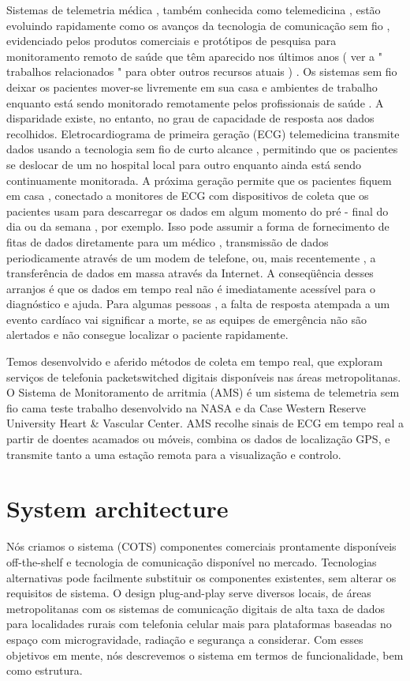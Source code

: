 \documentclass[a4paper,12pt]{article}
\begin{document}
Sistemas de telemetria médica , também conhecida como telemedicina , estão evoluindo rapidamente como os avanços da tecnologia de comunicação sem fio , evidenciado pelos produtos comerciais e protótipos de pesquisa para monitoramento remoto de saúde que têm aparecido nos últimos anos ( ver a " trabalhos relacionados " para obter outros recursos atuais ) . Os sistemas sem fio deixar os pacientes mover-se livremente em sua casa e ambientes de trabalho enquanto está sendo monitorado remotamente pelos profissionais de saúde . A disparidade existe, no entanto, no grau de capacidade de resposta aos dados recolhidos. Eletrocardiograma de primeira geração (ECG) telemedicina transmite dados usando a tecnologia sem fio de curto alcance , permitindo que os pacientes se deslocar de um no hospital local para outro enquanto ainda está sendo continuamente monitorada. A próxima geração permite que os pacientes fiquem em casa , conectado a monitores de ECG com dispositivos de coleta que os pacientes usam para descarregar os dados em algum momento do pré - final do dia ou da semana , por exemplo. Isso pode assumir a forma de fornecimento de fitas de dados diretamente para um médico , transmissão de dados periodicamente através de um modem de telefone, ou, mais recentemente , a transferência de dados em massa através da Internet. A conseqüência desses arranjos é que os dados em tempo real não é imediatamente acessível para o diagnóstico e ajuda. Para algumas pessoas , a falta de resposta atempada a um evento cardíaco vai significar a morte, se as equipes de emergência não são alertados e não consegue localizar o paciente rapidamente.

Temos desenvolvido e aferido métodos de coleta em tempo real, que exploram serviços de telefonia packetswitched digitais disponíveis nas áreas metropolitanas. O Sistema de Monitoramento de arritmia (AMS) é um sistema de telemetria sem fio cama teste trabalho desenvolvido na NASA e da Case Western Reserve University Heart & Vascular Center. AMS recolhe sinais de ECG em tempo real a partir de doentes acamados ou móveis, combina os dados de localização GPS, e transmite tanto a uma estação remota para a visualização e controlo.

\section{System architecture}

Nós criamos o sistema (COTS) componentes comerciais prontamente disponíveis off-the-shelf e tecnologia de comunicação disponível no mercado. Tecnologias alternativas pode facilmente substituir os componentes existentes, sem alterar os requisitos de sistema. O design plug-and-play serve diversos locais, de áreas metropolitanas com os sistemas de comunicação digitais de alta taxa de dados para localidades rurais com telefonia celular mais para plataformas baseadas no espaço com microgravidade, radiação e segurança a considerar. Com esses objetivos em mente, nós descrevemos o sistema em termos de funcionalidade, bem como estrutura.
\end{document}
